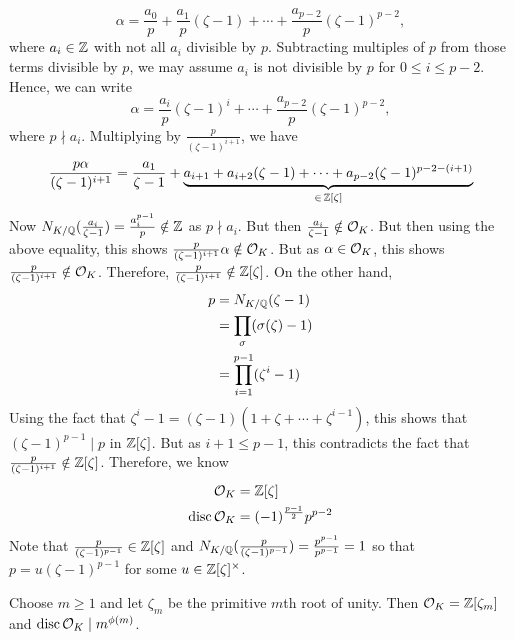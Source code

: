 \begin{ex}
	\[
	\alpha = \dfrac{a_0}{p} + \dfrac{a_1}{p} (\zeta-1) + \cdots + \dfrac{a_{p-2}}{p} (\zeta-1)^{p-2},
	\]
where $a_i \in \mathbb{Z}$ with not all $a_i$ divisible by $p$. Subtracting multiples of $p$ from those terms divisible by $p$, we may assume $a_i$ is not divisible by $p$ for $0 \leq i \leq p-2$. Hence, we can write
	\[
	\alpha = \dfrac{a_i}{p} (\zeta-1)^i + \cdots + \dfrac{a_{p-2}}{p} (\zeta-1)^{p-2},
	\]
where $p \nmid a_i$. Multiplying by $\frac{p}{(\zeta-1)^{i+1}}$, we have
	\[
	\dfrac{p\alpha}{(\zeta-1)^{i+1}} = \dfrac{a_1}{\zeta-1} + \underbrace{a_{i+1} + a_{i+2}(\zeta-1) + \cdots + a_{p-2}(\zeta-1)^{p-2-(i+1)}}_{\in\, \mathbb{Z}[\zeta]}
	\]
Now $N_{K/\mathbb{Q}}(\frac{a_i}{\zeta-1})= \frac{a_i^{p-1}}{p} \notin \mathbb{Z}$ as $p \nmid a_i$. But then $\frac{a_i}{\zeta-1} \notin \mathcal{O}_K$. But then using the above equality, this shows $\frac{p}{(\zeta-1)^{i+1}} \alpha \notin \mathcal{O}_K$. But as $\alpha \in \mathcal{O}_K$, this shows $\frac{p}{(\zeta-1)^{i+1}} \notin \mathcal{O}_K$. Therefore, $\frac{p}{(\zeta-1)^{i+1}} \notin \mathbb{Z}[\zeta]$. On the other hand,
	\[
	\begin{split}
	p&= N_{K/\mathbb{Q}}(\zeta-1) \\
	&= \prod_{\sigma} (\sigma(\zeta)-1) \\
	&=\prod_{i=1}^{p-1} (\zeta^i -1)
	\end{split}
	\]
Using the fact that $\zeta^i-1=(\zeta-1)(1+\zeta+\cdots+\zeta^{i-1})$, this shows that $(\zeta-1)^{p-1} \mid p$ in $\mathbb{Z}[\zeta]$. But as $i+1 \leq p-1$, this contradicts the fact that $\frac{p}{(\zeta-1)^{i+1}} \notin \mathbb{Z}[\zeta]$. Therefore, we know 
	\[
	\begin{split}
	\mathcal{O}_K&=\mathbb{Z}[\zeta] \\
	\operatorname{disc} \mathcal{O}_K&= (-1)^{\frac{p-1}{2}} p^{p-2}
	\end{split}
	\]
Note that $\frac{p}{(\zeta-1)^{p-1}} \in \mathbb{Z}[\zeta]$ and $N_{K/\mathbb{Q}}(\frac{p}{(\zeta-1)^{p-1}})= \frac{p^{p-1}}{p^{p-1}}=1$ so that $p=u(\zeta-1)^{p-1}$ for some $u \in \mathbb{Z}[\zeta]^\times$. \xqed
\end{ex}

\begin{rem}
Choose $m \geq 1$ and let $\zeta_m$ be the primitive $m$th root of unity. Then $\mathcal{O}_K=\mathbb{Z}[\zeta_m]$ and $\operatorname{disc} \mathcal{O}_K \mid m^{\phi(m)}$. 
\end{rem}



